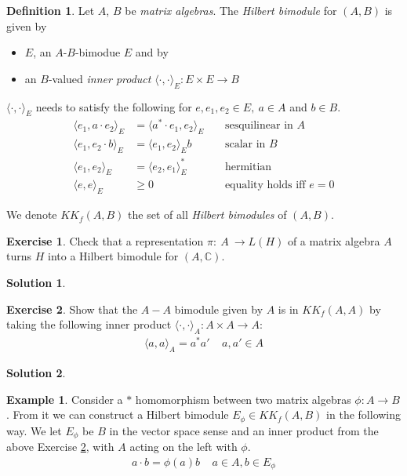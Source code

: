 \documentclass[a4paper]{article}
\theoremstyle{definition}
\newtheorem{definition}{Definition}
\theoremstyle{definition}
\theoremstyle{definition}
\newtheorem{example}{Example}
\theoremstyle{theorem}
\theoremstyle{theorem}
\newtheorem{exercise}{Exercise}
\theoremstyle{theorem}
\theoremstyle{definition}
\newtheorem{solution}{Solution}
\begin{document}
\begin{definition}
    Let $A$, $B$ be \textit{matrix algebras}. The \textit{Hilbert bimodule} for $(A, B)$ is given by
    \begin{itemize}
        \item $E$, an $A$-$B$-bimodue $E$ and by
        \item an $B$-valued \textit{inner product} $\langle \cdot,\cdot\rangle_E: E\times E \rightarrow B$
    \end{itemize}
$\langle \cdot,\cdot\rangle_E$ needs to satisfy the following for $e, e_1, e_2 \in E,\ a \in A$ and $b \in B$.
\begin{align*}
    \langle e_1, a\cdot e_2\rangle_E &= \langle a^*\cdot e_1, e_2\rangle_E \;\;\;\; & \text{sesquilinear in $A$}\\
    \langle e_1, e_2 \cdot b\rangle_E &= \langle e_1, e_2\rangle_E b \;\;\;\; & \text{scalar in $B$} \\
    \langle e_1, e_2\rangle_E &= \langle e_2,e_1\rangle^*_E \;\;\;\; & \text{hermitian} \\
    \langle e, e\rangle_E &\ge 0 \;\;\;\; & \text{equality holds iff $e=0$}
\end{align*}

\end{definition}

We denote $KK_f(A,B)$ the set of all \textit{Hilbert bimodules} of $(A,B)$.

\begin{exercise}
    Check that a representation $\pi:\ A \ \rightarrow L(H)$ of a matrix algebra $A$ turns $H$ into
    a Hilbert bimodule for $(A, \mathbb{C})$.
\end{exercise}

\begin{solution}
\end{solution}

\begin{exercise}
    Show that the $A-A$ bimodule given by $A$ is in $KK_f(A,A)$ by taking the following inner product
    $\langle \cdot,\cdot\rangle_A:A \times A \rightarrow A$:
    \begin{align*}
        \langle a, a\rangle_A = a^*a' \;\;\;\; a,a'\in A
    \end{align*}
    \label{exercise: inner-product}
\end{exercise}
\begin{solution}
\end{solution}

\begin{example}
    Consider a $*$ homomorphism between two matrix algebras $\phi:A\rightarrow B$.
    From it we can construct a Hilbert bimodule $E_{\phi} \in KK_f(A, B)$ in the following way.
    We let $E_{\phi}$ be $B$ in the vector space sense and an inner product from the above
    Exercise \ref{exercise: inner-product}, with $A$ acting on the left with $\phi$.
    \begin{align*}
        a\cdot b = \phi(a)b \;\;\;\; a\in A, b\in E_{\phi}
    \end{align*}
\end{example}
\end{document}
